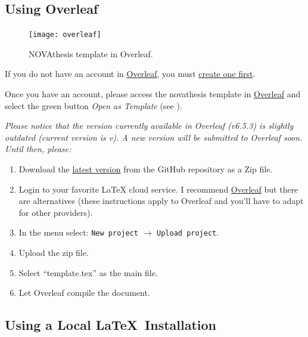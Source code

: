 \subsection{Using Overleaf}
\label{sub:using_overleaf}

\begin{figure}
\vspace*{-10ex}
\texttt{[image: overleaf]}%
\caption{NOVAthesis template in Overleaf.}
\label{fig:overleaf}
\end{figure}

If you do not have an account in \href{https://www.overleaf.com?r=f5160636&rm=d&rs=b}{Overleaf}, you must \href{https://www.overleaf.com?r=f5160636&rm=d&rs=b}{create one first}.

Once you have an account, please access the \gls{novathesis} template in \href{https://www.overleaf.com/latex/templates/new-university-of-lisbon-universidade-nova-de-lisboa-slash-unl-thesis-template/fwbztcrptjmg}{Overleaf} and select the green button \emph{Open as Template} (see ).

\bgroup
  \itshape
  Please notice that the version currently available in Overleaf (v6.5.3) is slightly outdated (current version is v\novathesisversion). A new version will be submitted to Overleaf soon.  Until then, please:
  \begin{enumerate}
    \item Download the \href{https://github.com/joaomlourenco/novathesis/archive/master.zip}{latest version} from the GitHub repository as a Zip file.
    \item Login to your favorite LaTeX cloud service. I recommend \href{https://www.overleaf.com/?r=f5160636&rm=d&rs=b}{Overleaf} but there are alternatives (these instructions apply to Overleaf and you'll have to adapt for other providers).
    \item In the menu select: \texttt{New project} $\rightarrow$ \texttt{Upload project}.
    \item Upload the zip file.
    \item Select “template.tex” as the main file.
    \item Let Overleaf compile the document.
  \end{enumerate}
\egroup

\subsection{Using a Local \LaTeX\ Installation}
\label{sub:using_local_latex}

